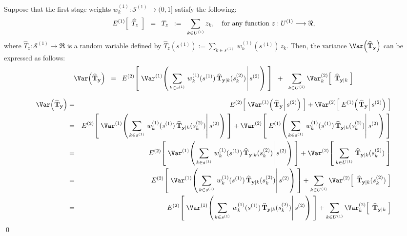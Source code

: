 \begin{proposition}
\quad
Suppose that
the first-stage weights $w^{(1)}_{k} : \mathcal{S}^{(1)} \longrightarrow (0,1]$
satisfy the following:
\begin{equation*}
E^{(1)}\!\left[\;\,\widehat{T}_{z}\,\;\right] \;\; = \;\; T_{z} \;\;:=\;\; \sum_{k\in U^{(1)}}z_{k},
\quad\textnormal{for any function $z : U^{(1)} \longrightarrow \Re$,}
\end{equation*}
where $\widehat{T}_{z} : \mathcal{S}^{(1)} \longrightarrow \Re$ is a random variable defined by
$\widehat{T}_{z}(s^{(1)}) := \underset{k \in s^{(1)}}{\sum}\,w^{(1)}_{k}(s^{(1)})\,z_{k}$.
Then, the variance $\Var\!\left(\widehat{\mathbf{T}}_{\mathbf{y}}\right)$ can be expressed as follows:
		\begin{equation*}
		\Var\!\left(\widehat{\mathbf{T}}_{\mathbf{y}}\right)
		\;\;=\;\;
		E^{(2)}\!\left[\;\Var^{(1)}\!\left(\left.
		\sum_{k\in s^{(1)}}\,w^{(1)}_{k}(s^{(1)})\,\widehat{\mathbf{T}}_{\mathbf{y}\vert k}(s^{(2)}_{k})
		\right\vert s^{(2)}\right)\;\right]
		\;\;+\;\;
		\sum_{k\in U^{(1)}}\Var^{(2)}_{k}\!\left[\;\,\widehat{\mathbf{T}}_{\mathbf{y}\vert k}\;\right]
		\end{equation*}
\end{proposition}

\proof
\begin{eqnarray*}
\Var\!\left(\widehat{\mathbf{T}}_{\mathbf{y}}\right)
&=&
E^{(2)}\!\left[\;\Var^{(1)}\!\left(\left.\widehat{\mathbf{T}}_{\mathbf{y}}\right\vert s^{(2)}\right)\;\right]
+
\Var^{(2)}\!\left[\;E^{(1)}\!\left(\left.\widehat{\mathbf{T}}_{\mathbf{y}}\right\vert s^{(2)}\right)\;\right] \\
&=&
E^{(2)}\!\left[\;\Var^{(1)}\!\left(\left.
\sum_{k\in s^{(1)}}\,w^{(1)}_{k}(s^{(1)})\,\widehat{\mathbf{T}}_{\mathbf{y}\vert k}(s^{(2)}_{k})
\right\vert s^{(2)}\right)\;\right]
+
\Var^{(2)}\!\left[\;E^{(1)}\!\left(\left.
\sum_{k\in s^{(1)}}\,w^{(1)}_{k}(s^{(1)})\,\widehat{\mathbf{T}}_{\mathbf{y}\vert k}(s^{(2)}_{k})
\right\vert s^{(2)}\right)\;\right]
\\
&=&
E^{(2)}\!\left[\;\Var^{(1)}\!\left(\left.
\sum_{k\in s^{(1)}}\,w^{(1)}_{k}(s^{(1)})\,\widehat{\mathbf{T}}_{\mathbf{y}\vert k}(s^{(2)}_{k})
\right\vert s^{(2)}\right)\;\right]
+
\Var^{(2)}\!\left[\;
\sum_{k\in U^{(1)}}\,\widehat{\mathbf{T}}_{\mathbf{y}\vert k}(s^{(2)}_{k})
\;\right]
\\
&=&
E^{(2)}\!\left[\;\Var^{(1)}\!\left(\left.
\sum_{k\in s^{(1)}}\,w^{(1)}_{k}(s^{(1)})\,\widehat{\mathbf{T}}_{\mathbf{y}\vert k}(s^{(2)}_{k})
\right\vert s^{(2)}\right)\;\right]
+
\sum_{k\in U^{(1)}}
\Var^{(2)}\!\left[\;
\,\widehat{\mathbf{T}}_{\mathbf{y}\vert k}(s^{(2)}_{k})
\;\right]
\\
&=&
E^{(2)}\!\left[\;\Var^{(1)}\!\left(\left.
\sum_{k\in s^{(1)}}\,w^{(1)}_{k}(s^{(1)})\,\widehat{\mathbf{T}}_{\mathbf{y}\vert k}(s^{(2)}_{k})
\right\vert s^{(2)}\right)\;\right]
+
\sum_{k\in U^{(1)}}\Var^{(2)}_{k}\!\left[\;\,\widehat{\mathbf{T}}_{\mathbf{y}\vert k}\;\right]
\end{eqnarray*}
\qed

